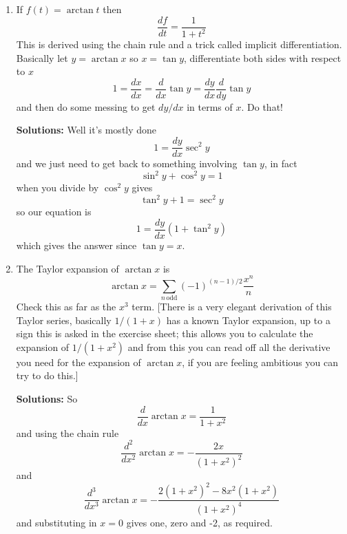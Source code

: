 \documentclass[12pt]{article}
\begin{document}
\begin{enumerate}
\item If $f(t)=\arctan{t}$ then 
\begin{equation}
\frac{df}{dt}=\frac{1}{1+t^2}
\end{equation}
This is derived using the chain rule and a trick called implicit differentiation. Basically let $y=\arctan{x}$ so $x=\tan{y}$, differentiate both sides with respect to $x$
\begin{equation}
1=\frac{dx}{dx}=\frac{d}{dx}\tan{y}=\frac{dy}{dx}\frac{d}{dy}\tan{y}
\end{equation}
and then do some messing to get $dy/dx$ in terms of $x$. Do that!

\textbf{Solutions: } Well it's mostly done
\begin{equation}
1=\frac{dy}{dx}\sec^2{y}
\end{equation}
and we just need to get back to something involving $\tan{y}$, in fact
\begin{equation}
\sin^2{y}+\cos^2{y}=1
\end{equation}
when you divide by $\cos^2{y}$ gives
\begin{equation}
\tan^2{y}+1=\sec^2{y}
\end{equation}
so our equation is
\begin{equation}
1=\frac{dy}{dx}(1+\tan^2{y})
\end{equation}
which gives the answer since $\tan{y}=x$.

\item The Taylor expansion of $\arctan{x}$ is 
\begin{equation}
\arctan{x}=\sum_{n\,\mbox{odd}} (-1)^{(n-1)/2}\frac{x^n}{n}
\end{equation}
Check this as far as the $x^3$ term. [There is a very elegant derivation of this Taylor series, basically $1/(1+x)$ has a known Taylor expansion, up to a sign this is asked in the exercise sheet; this allows you to calculate the expansion of $1/(1+x^2)$ and from this you can read off all the derivative you need for the expansion of $\arctan{x}$, if you are feeling ambitious you can try to do this.]

\textbf{Solutions: } So 
\begin{equation}
\frac{d}{dx}\arctan{x}=\frac{1}{1+x^2}
\end{equation}
and using the chain rule
\begin{equation}
\frac{d^2}{dx^2}\arctan{x}=-\frac{2x}{(1+x^2)^2}
\end{equation}
and
\begin{equation}
\frac{d^3}{dx^3}\arctan{x}=-\frac{2(1+x^2)^2-8x^2(1+x^2)}{(1+x^2)^4}
\end{equation}
and substituting in $x=0$ gives one, zero and -2, as required.


\end{enumerate}
\end{document}
